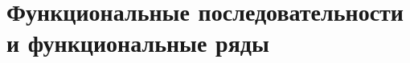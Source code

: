 \documentclass[../main.tex]{subfiles}
\begin{document}
 \chapter{Функциональные последовательности и функциональные ряды}
 
 
\end{document}
